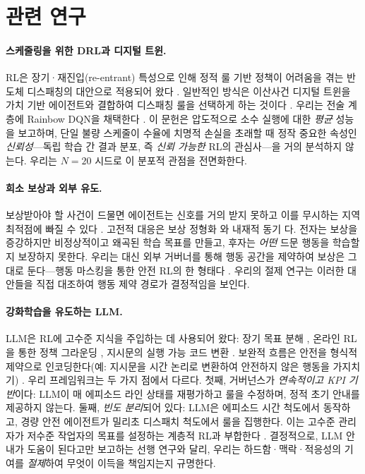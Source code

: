 \documentclass[letterpaper]{article} %
\begin{document}
\section{관련 연구}
\label{sec:related}

\paragraph{스케줄링을 위한 DRL과 디지털 트윈.}
RL은 장기·재진입(re-entrant) 특성으로 인해 정적 룰 기반 정책이 어려움을 겪는
반도체 디스패칭의 대안으로 적용되어 왔다 \citep{waschneck2018,hu2019}. 일반적인
방식은 이산사건 디지털 트윈을 가치 기반 에이전트와 결합하여 디스패칭 룰을
선택하게 하는 것이다 \citep{lee2025}. 우리는 전술 계층에 Rainbow DQN을 채택한다
\citep{hessel2018}. 이 문헌은 압도적으로 소수 실행에 대한 \emph{평균} 성능을
보고하며, 단일 불량 스케줄이 수율에 치명적 손실을 초래할 때 정작 중요한 속성인
\emph{신뢰성}---독립 학습 간 결과 분포, 즉 \emph{신뢰 가능한} RL의 관심사---을 거의
분석하지 않는다. 우리는 $N{=}20$ 시드로 이 분포적 관점을 전면화한다.

\paragraph{희소 보상과 외부 유도.}
보상받아야 할 사건이 드물면 에이전트는 신호를 거의 받지 못하고 이를 무시하는 지역
최적점에 빠질 수 있다 \citep{pathak2017}. 고전적 대응은 보상 정형화
\citep{ng1999}와 내재적 동기 \citep{pathak2017}다. 전자는 보상을 증강하지만
비정상적이고 왜곡된 학습 목표를 만들고, 후자는 \emph{어떤} 드문 행동을 학습할지
보장하지 못한다. 우리는 대신 외부 거버너를 통해 행동 공간을 제약하여 보상은 그대로
둔다---행동 마스킹을 통한 안전 RL의 한 형태다 \citep{garcia2015}. 우리의 절제
연구는 이러한 대안들을 직접 대조하여 행동 제약 경로가 결정적임을 보인다.

\paragraph{강화학습을 유도하는 LLM.}
LLM은 RL에 고수준 지식을 주입하는 데 사용되어 왔다: 장기 목표 분해
\citep{du2023}, 온라인 RL을 통한 정책 그라운딩 \citep{carta2023}, 지시문의 실행
가능 코드 변환 \citep{liang2023}. 보완적 흐름은 안전을 형식적 제약으로
인코딩한다(예: 지시문을 시간 논리로 변환하여 안전하지 않은 행동을 가지치기)
\citep{hasanbeig2020}. 우리 프레임워크는 두 가지 점에서 다르다. 첫째, 거버넌스가
\emph{연속적이고 KPI 기반}이다: LLM이 매 에피소드 라인 상태를 재평가하고 룰을
수정하며, 정적 초기 안내를 제공하지 않는다. 둘째, \emph{빈도 분리}되어 있다: LLM은
에피소드 시간 척도에서 동작하고, 경량 안전 에이전트가 밀리초 디스패치 척도에서
룰을 집행한다. 이는 고수준 관리자가 저수준 작업자의 목표를 설정하는 계층적 RL과
부합한다 \citep{vezhnevets2017}. 결정적으로, LLM 안내가 도움이 된다고만 보고하는
선행 연구와 달리, 우리는 하드함·맥락·적응성의 기여를 \emph{절제}하여 무엇이 이득을
책임지는지 규명한다.
\end{document}

